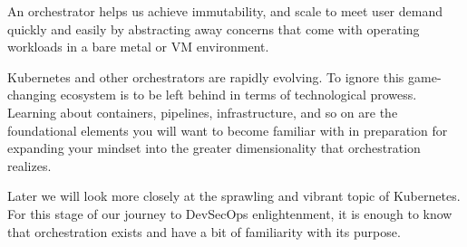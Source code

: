 \justify{}
An orchestrator helps us achieve immutability, and scale to meet user demand quickly and easily by abstracting away
concerns that come with operating workloads in a bare metal or VM environment.

\justify{}
Kubernetes and other orchestrators are rapidly evolving. To ignore this game-changing ecosystem is to be left behind in terms of technological prowess. Learning about containers, pipelines, infrastructure, and
so on are the foundational elements you will want to become familiar with in preparation for expanding your mindset into the greater
dimensionality that orchestration realizes.

\justify{}
Later we will look more closely at the sprawling and vibrant topic of Kubernetes. For this stage of our journey to DevSecOps
enlightenment, it is enough to know that orchestration exists and have a bit of familiarity with its purpose.
